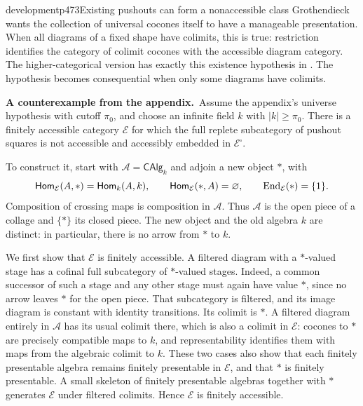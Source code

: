 
\begin{dcomment}{development}{p473}{Existing pushouts can form a nonaccessible class}
Grothendieck wants the collection of universal cocones itself to have a manageable presentation. When all diagrams of a fixed shape have colimits, this is true: restriction identifies the category of colimit cocones with the accessible diagram category. The higher-categorical version has exactly this existence hypothesis in \citet[Example~5.4.7.9]{Lurie2009HTT}. The hypothesis becomes consequential when only some diagrams have colimits.

\textbf{A counterexample from the appendix.}\ours\
Assume the appendix's universe hypothesis with cutoff $\pi_0$, and choose an infinite field $k$ with $|k|\ge\pi_0$. There is a finitely accessible category $\mathcal E$ for which the full replete subcategory of pushout squares is not accessible and accessibly embedded in $\mathcal E^\square$.

To construct it, start with $\mathcal A=\mathsf{CAlg}_k$ and adjoin a new object $*$, with
\[
 \mathsf{Hom}_{\mathcal E}(A,*)=\mathsf{Hom}_k(A,k),\qquad
 \mathsf{Hom}_{\mathcal E}(*,A)=\varnothing,\qquad
 \operatorname{End}_{\mathcal E}(*)=\{1\}.
\]
Composition of crossing maps is composition in $\mathcal A$. Thus $\mathcal A$ is the open piece of a collage and $\{*\}$ its closed piece. The new object and the old algebra $k$ are distinct: in particular, there is no arrow from $*$ to $k$.

We first show that $\mathcal E$ is finitely accessible. A filtered diagram with a $*$-valued stage has a cofinal full subcategory of $*$-valued stages. Indeed, a common successor of such a stage and any other stage must again have value $*$, since no arrow leaves $*$ for the open piece. That subcategory is filtered, and its image diagram is constant with identity transitions. Its colimit is $*$. A filtered diagram entirely in $\mathcal A$ has its usual colimit there, which is also a colimit in $\mathcal E$: cocones to $*$ are precisely compatible maps to $k$, and representability identifies them with maps from the algebraic colimit to $k$. These two cases also show that each finitely presentable algebra remains finitely presentable in $\mathcal E$, and that $*$ is finitely presentable. A small skeleton of finitely presentable algebras together with $*$ generates $\mathcal E$ under filtered colimits. Hence $\mathcal E$ is finitely accessible.


\end{dcomment}
